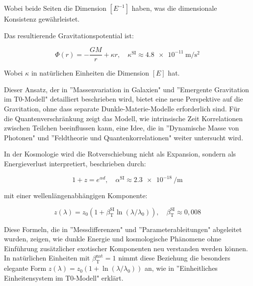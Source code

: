\documentclass[a4paper,12pt]{article}
\newcommand{\betaT}{\beta_{\text{T}}}
\begin{document}
	Wobei beide Seiten die Dimension \([E^{-1}]\) haben, was die dimensionale Konsistenz gewährleistet.
	
	Das resultierende Gravitationspotential ist:
	
	\begin{equation}
		\Phi(r) = -\frac{G M}{r} + \kappa r, \quad \kappa^{\text{SI}} \approx \SI{4,8e-11}{\meter\per\second\squared}
	\end{equation}
	
	Wobei \(\kappa\) in natürlichen Einheiten die Dimension \([E]\) hat.
	
	Dieser Ansatz, der in ''Massenvariation in Galaxien" \cite{pascher_galaxies_2025} und ''Emergente Gravitation im T0-Modell" \cite{pascher_emergente_gravitation_2025} detailliert beschrieben wird, bietet eine neue Perspektive auf die Gravitation, ohne dass separate Dunkle-Materie-Modelle erforderlich sind. Für die Quantenverschränkung zeigt das Modell, wie intrinsische Zeit Korrelationen zwischen Teilchen beeinflussen kann, eine Idee, die in ''Dynamische Masse von Photonen" \cite{pascher_photons_2025} und ''Feldtheorie und Quantenkorrelationen" \cite{pascher_feldtheorie_2025} weiter untersucht wird.
	
	In der Kosmologie wird die Rotverschiebung nicht als Expansion, sondern als Energieverlust interpretiert, beschrieben durch:
	
	\begin{equation}
		1 + z = e^{\alpha d}, \quad \alpha^{\text{SI}} \approx \SI{2,3e-18}{\per\meter}
	\end{equation}
	
	mit einer wellenlängenabhängigen Komponente:
	
	\begin{equation}
		z(\lambda) = z_0 (1 + \betaT^{\text{SI}} \ln(\lambda/\lambda_0)), \quad \betaT^{\text{SI}} \approx 0,008
	\end{equation}
	
	Diese Formeln, die in ''Messdifferenzen" \cite{pascher_messdifferenzen_2025} und ''Parameterableitungen" \cite{pascher_params_2025} abgeleitet wurden, zeigen, wie dunkle Energie und kosmologische Phänomene ohne Einführung zusätzlicher exotischer Komponenten neu verstanden werden können. In natürlichen Einheiten mit \(\betaT^{\text{nat}} = 1\) nimmt diese Beziehung die besonders elegante Form \(z(\lambda) = z_0 (1 + \ln(\lambda/\lambda_0))\) an, wie in ''Einheitliches Einheitensystem im T0-Modell" \cite{pascher_alphabeta_2025} erklärt.
	
\end{document}

